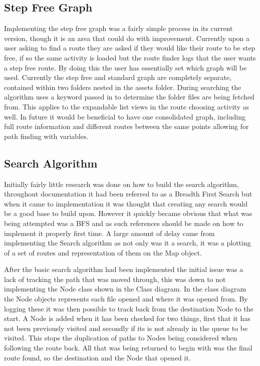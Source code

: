 \subsection{Step Free Graph}
Implementing the step free graph was a fairly simple process in its current version, though it is an area that could do with improvement. Currently upon a user asking to find a route they are asked if they would like their route to be step free, if so the same activity is loaded but the route finder logs that the user wants a step free route. By doing this the user has essentially set which graph will be used. Currently the step free and standard graph are completely separate, contained within two folders nested in the assets folder. During searching the algorithm uses a keyword passed in to determine the folder files are being fetched from. This applies to the expandable list views in the route choosing activity as well. In future it would be beneficial to have one consolidated graph, including full route information and different routes between the same points allowing for path finding with variables.  
\newpage
\subsection{Search Algorithm}

Initially fairly little research was done on how to build the search algorithm, throughout documentation it had been referred to as a Breadth First Search but when it came to implementation it was thought that creating any search would be a good base to build upon. However it quickly became obvious that what was being attempted was a BFS\cite{bfs} and as such references should be made on how to implement it properly first time. A large amount of delay came from implementing the Search algorithm as not only was it a search, it was a plotting of a set of routes and representation of them on the Map object. 

After the basic search algorithm had been implemented the initial issue was a lack of tracking the path that was moved through, this was down to not implementing the Node class shown in the Class diagram. In the class diagram the Node objects represents each file opened and where it was opened from. By logging these it was then possible to track back from the destination Node to the start. A Node is added when it has been checked for two things, first that it has not been previously visited and secondly if its is not already in the queue to be visited. This stops the duplication of paths to Nodes being considered when following the route back. All that was being returned to begin with was the final route found, so the destination and the Node that opened it.

